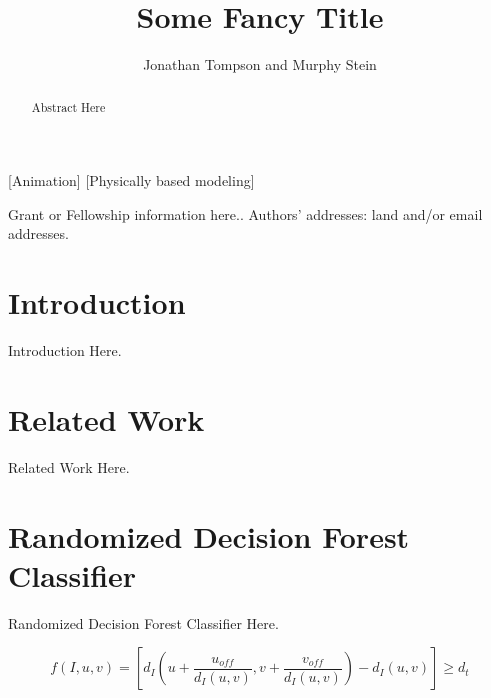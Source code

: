 \documentclass{acmtog}
\begin{document}

\title{Some Fancy Title} %

\author{Jonathan Tompson {\upshape and} Murphy Stein
}

[Animation]
[Physically based modeling]




\maketitle

\begin{bottomstuff} 
Grant or Fellowship information here..
Authors' addresses: land and/or email addresses.
\end{bottomstuff}


\begin{abstract} 
  Abstract Here
\end{abstract}

\section{Introduction}
\label{sec:introduction}

Introduction Here.

\section{Related Work}
\label{sec:relatedwork}

Related Work Here.

\section{Randomized Decision Forest Classifier}
\label{sec:randomizeddecisionforestclassifier}

Randomized Decision Forest Classifier Here.

\begin{equation}
f\left(I, u, v\right)=\left[d_I\left(u + \frac{u_{off}}{d_I\left(u,v\right)}, v + \frac{v_{off}}{d_I\left(u,v\right)}\right) - d_I\left(u,v\right)\right]\geq d_{t}
\end{equation}
\end{document}
